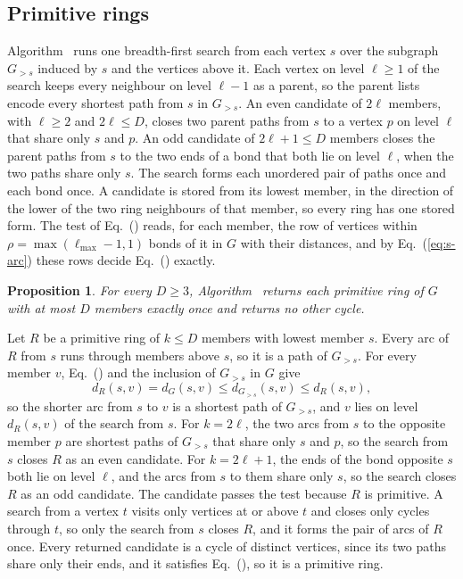 \documentclass[preprint,12pt]{elsarticle}
\newtheorem{proposition}{Proposition}
\begin{document}
\subsection{Primitive rings}
\label{sec:s-rings}

Algorithm~ runs one breadth-first search from each
vertex $s$ over the subgraph $G_{>s}$ induced by $s$ and the vertices
above it.
Each vertex on level $\ell\ge 1$ of the search keeps every neighbour on
level $\ell-1$ as a parent, so the parent lists encode every shortest
path from $s$ in $G_{>s}$.
An even candidate of $2\ell$ members, with $\ell\ge 2$ and $2\ell\le D$,
closes two parent paths from $s$ to a vertex $p$ on level $\ell$ that
share only $s$ and $p$.
An odd candidate of $2\ell+1\le D$ members closes the parent paths from
$s$ to the two ends of a bond that both lie on level $\ell$, when the
two paths share only $s$.
The search forms each unordered pair of paths once and each bond once.
A candidate is stored from its lowest member, in the direction of the
lower of the two ring neighbours of that member, so every ring has one
stored form.
The test of Eq.~() reads, for each member, the row of
vertices within $\rho=\max(\ell_{\max}-1,1)$ bonds of it in $G$ with
their distances, and by Eq.~(\ref{eq:s-arc}) these rows decide
Eq.~() exactly.

\begin{proposition}
\label{prop:s-rings} For every $D\ge 3$, Algorithm~
returns each primitive ring of $G$ with at most $D$ members exactly once
and returns no other cycle.
\end{proposition}

\begin{pf}
Let $R$ be a primitive ring of $k\le D$ members with lowest member $s$.
Every arc of $R$ from $s$ runs through members above $s$, so it is a
path of $G_{>s}$.
For every member $v$, Eq.~() and the inclusion of
$G_{>s}$ in $G$ give
\begin{equation*}
  d_R(s,v)=d_G(s,v)\le d_{G_{>s}}(s,v)\le d_R(s,v),
\end{equation*}
so the shorter arc from $s$ to $v$ is a shortest path of $G_{>s}$, and
$v$ lies on level $d_R(s,v)$ of the search from $s$.
For $k=2\ell$, the two arcs from $s$ to the opposite member $p$ are
shortest paths of $G_{>s}$ that share only $s$ and $p$, so the search
from $s$ closes $R$ as an even candidate.
For $k=2\ell+1$, the ends of the bond opposite $s$ both lie on level
$\ell$, and the arcs from $s$ to them share only $s$, so the search
closes $R$ as an odd candidate.
The candidate passes the test because $R$ is primitive.
A search from a vertex $t$ visits only vertices at or above $t$ and
closes only cycles through $t$, so only the search from $s$ closes $R$,
and it forms the pair of arcs of $R$ once.
Every returned candidate is a cycle of distinct vertices, since its two
paths share only their ends, and it satisfies Eq.~(),
so it is a primitive ring.
\end{pf}
\end{document}
